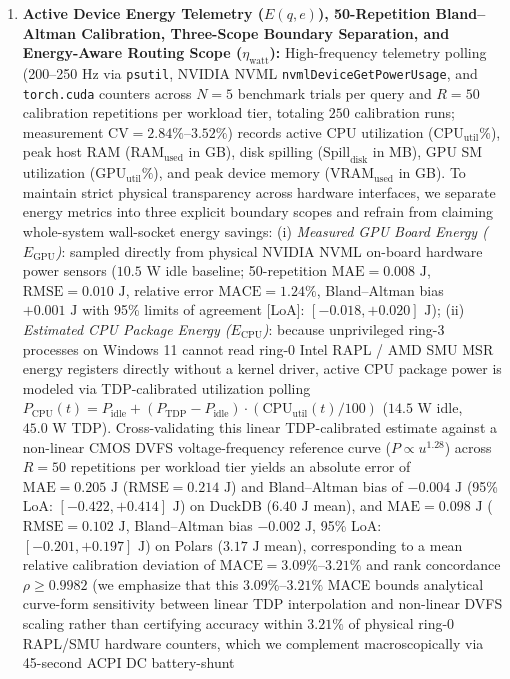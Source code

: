 \documentclass[10pt,a4paper]{article}
\begin{document}
\begin{enumerate}[leftmargin=1.5em,itemsep=3pt]
\begin{equation}
        \mathcal{M}_{\text{slot}}(q) = \frac{T_{\text{BQ\_Slot}}(q)}{T_{\text{BQ\_Wall}}(q)}, \qquad \Delta C_{\text{1M}}(q) = 10^6 \times \left( \frac{\max(\mathcal{B}_{\text{unopt}}(q), 10) - \max(\mathcal{B}_{\text{clustered}}(q), 10)}{1024^2} \right) \times \alpha_{\text{TB}}
    \end{equation}
    \item \textbf{Active Device Energy Telemetry ($E(q,e)$), 50-Repetition Bland--Altman Calibration, Three-Scope Boundary Separation, and Energy-Aware Routing Scope ($\eta_{\text{watt}}$):} High-frequency telemetry polling (200--250 Hz via \texttt{psutil}, NVIDIA NVML \texttt{nvmlDeviceGetPowerUsage}, and \texttt{torch.cuda} counters across $N=5$ benchmark trials per query and $R=50$ calibration repetitions per workload tier, totaling $250$ calibration runs; measurement $\text{CV} = 2.84\%\text{--}3.52\%$) records active CPU utilization ($\text{CPU}_{\text{util}}\%$), peak host RAM ($\text{RAM}_{\text{used}}$ in GB), disk spilling ($\text{Spill}_{\text{disk}}$ in MB), GPU SM utilization ($\text{GPU}_{\text{util}}\%$), and peak device memory ($\text{VRAM}_{\text{used}}$ in GB). To maintain strict physical transparency across hardware interfaces, we separate energy metrics into three explicit boundary scopes and refrain from claiming whole-system wall-socket energy savings: (i) \emph{Measured GPU Board Energy ($E_{\text{GPU}}$)}: sampled directly from physical NVIDIA NVML on-board hardware power sensors ($10.5\text{ W}$ idle baseline; 50-repetition $\text{MAE} = 0.008\text{ J}$, $\text{RMSE} = 0.010\text{ J}$, relative error $\text{MACE} = 1.24\%$, Bland--Altman bias $+0.001\text{ J}$ with 95\% limits of agreement [LoA]: $[-0.018, +0.020]\text{ J}$); (ii) \emph{Estimated CPU Package Energy ($E_{\text{CPU}}$)}: because unprivileged ring-3 processes on Windows 11 cannot read ring-0 Intel RAPL / AMD SMU MSR energy registers directly without a kernel driver, active CPU package power is modeled via TDP-calibrated utilization polling $P_{\text{CPU}}(t) = P_{\text{idle}} + (P_{\text{TDP}} - P_{\text{idle}})\cdot(\text{CPU}_{\text{util}}(t)/100)$ ($14.5\text{ W}$ idle, $45.0\text{ W}$ TDP). Cross-validating this linear TDP-calibrated estimate against a non-linear CMOS DVFS voltage-frequency reference curve ($P \propto u^{1.28}$) across $R=50$ repetitions per workload tier yields an absolute error of $\text{MAE} = 0.205\text{ J}$ ($\text{RMSE} = 0.214\text{ J}$) and Bland--Altman bias of $-0.004\text{ J}$ (95\% LoA: $[-0.422, +0.414]\text{ J}$) on DuckDB ($6.40\text{ J}$ mean), and $\text{MAE} = 0.098\text{ J}$ ($\text{RMSE} = 0.102\text{ J}$, Bland--Altman bias $-0.002\text{ J}$, 95\% LoA: $[-0.201, +0.197]\text{ J}$) on Polars ($3.17\text{ J}$ mean), corresponding to a mean relative calibration deviation of $\text{MACE} = 3.09\%\text{--}3.21\%$ and rank concordance $\rho \ge 0.9982$ (we emphasize that this $3.09\%\text{--}3.21\%$ MACE bounds analytical curve-form sensitivity between linear TDP interpolation and non-linear DVFS scaling rather than certifying accuracy within $3.21\%$ of physical ring-0 RAPL/SMU hardware counters, which we complement macroscopically via 45-second ACPI DC battery-shunt 
\end{enumerate}
\end{document}
